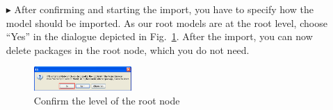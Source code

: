 \begin{enumerate}
\item[$\blacktriangleright$]
After confirming and starting the import, you have to specify how the model should be imported.
As our root models are at the root level, choose ``Yes'' in the dialogue depicted in Fig.~\ref{fig_projectMigration06}.
After the import, you can now delete packages in the root node, which you do not need.
\begin{figure}[htbp]
\begin{center}
  \includegraphics[width=0.35\textwidth]{pics/tricks/projectMigration/projectMigration6}
  \caption{Confirm the level of the root node}  
  \label{fig_projectMigration06}
\end{center}
\end{figure}

\end{enumerate}

